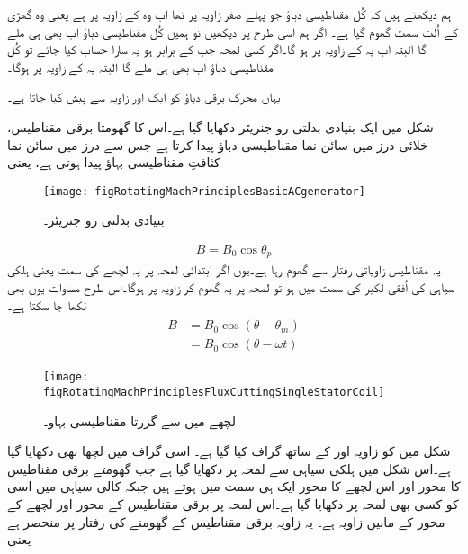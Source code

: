 ہم دیکھتے ہیں کہ کُل مقناطیسی دباؤ جو پہلے صفر زاویہ پر تھا اب وہ   کے زاویہ پر ہے یعنی وہ گھڑی کے اُلٹ سمت گھوم گیا ہے۔ اگر ہم اسی طرح  پر دیکھیں تو ہمیں کُل مقناطیسی دباؤ اب بھی  ہی ملے گا البتہ اب یہ  کے زاویہ پر ہو گا۔اگر کسی لمحہ جب  کے برابر ہو یہ سارا حساب کیا جائے تو کُل مقناطیسی دباؤ اب بھی  ہی ملے گا البتہ یہ  کے زاویہ پر ہوگا۔

یہاں محرک برقی دباؤ کو ایک اور زاویہ سے پیش کیا جاتا ہے۔

شکل   میں ایک بنیادی بدلتی رو جنریٹر دکھایا گیا ہے۔اس کا گھومتا برقی مقناطیس، خلائی درز میں سائن نما مقناطیسی دباؤ  پیدا کرتا ہے جس سے  درز میں سائن نما کثافتِ مقناطیسی بہاؤ   پیدا ہوتی ہے، یعنی
\begin{figure}
\centering
\texttt{[image: figRotatingMachPrinciplesBasicACgenerator]}
\caption{بنیادی بدلتی رو جنریٹر۔}
\label{شکل_گھومتے_مشین_بنیادی_بدلتی_رو_جنریٹر}
\end{figure}
%
\begin{align}
B=B_0 \cos \theta_p
\end{align}
یہ مقناطیس  زاویاتی رفتار سے گھوم رہا ہے۔یوں اگر ابتدائی لمحہ   پر  یہ  لچھے کی سمت یعنی ہلکی سیاہی کی  اُفقی لکیر کی سمت میں ہو تو لمحہ   پر یہ گھوم کر زاویہ  پر ہوگا۔اس طرح مساوات   یوں بھی لکھا جا سکتا ہے۔
\begin{gather}
\begin{aligned}
B&=B_0 \cos (\theta-\theta_m)\\
&=B_0 \cos (\theta -\omega t)
\end{aligned}
\end{gather}
%
\begin{figure}
\centering
\texttt{[image: figRotatingMachPrinciplesFluxCuttingSingleStatorCoil]}
\caption{لچھے میں سے گزرتا مقناطیسی بہاو۔}
\label{شکل_گھومتے_مشین_لچھے_سے_گزرتی_بیاو}
\end{figure}
%
شکل   میں  کو زاویہ  اور   کے ساتھ گراف کیا گیا ہے۔ اسی گراف میں لچھا  بھی دکھایا گیا ہے۔اس شکل میں ہلکی سیاہی سے لمحہ  پر  دکھایا گیا ہے جب گھومتے برقی مقناطیس کا محور اور اس لچھے کا محور ایک ہی سمت میں ہوتے ہیں جبکہ کالی سیاہی میں اسی  کو کسی  بھی لمحہ  پر دکھایا گیا ہے۔اس لمحہ پر برقی مقناطیس کے محور اور لچھے کے محور کے مابین  زاویہ ہے۔ یہ زاویہ برقی مقناطیس کے گھومنے کی رفتار  پر منحصر ہے یعنی
